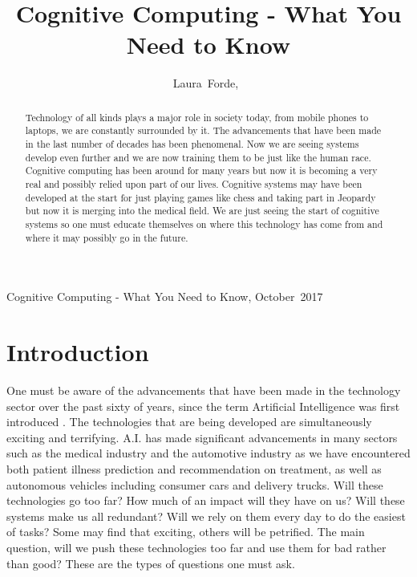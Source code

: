 \documentclass[journal]{IEEEtran}
\begin{document}
%
{Cognitive Computing - What You Need to Know, October~2017}

\title{Cognitive Computing - What You Need to Know}
\author{Laura~Forde,~%
}

\maketitle


\begin{abstract}
Technology of all kinds plays a major role in society today, from mobile phones to laptops, we are constantly surrounded by it. The advancements that have been made in the last number of decades has been phenomenal. Now we are seeing systems develop even further and we are now training them to be just like the human race. Cognitive computing has been around for many years but now it is becoming a very real and possibly relied upon part of our lives. Cognitive systems may have been developed at the start for just playing games like chess and taking part in Jeopardy but now it is merging into the medical field. We are just seeing the start of cognitive systems so one must educate themselves on where this technology has come from and where it may possibly go in the future.
\end{abstract}



\section{Introduction}
One must be aware of the advancements that have been made in the technology sector over the past sixty of years, since the term Artificial Intelligence was first introduced \cite{IBMResearch}. The technologies that are being developed are simultaneously exciting and terrifying. A.I. has made significant advancements in many sectors such as the medical industry\cite{WellPointIBM} and the automotive industry as we have encountered both patient illness prediction and recommendation on treatment, as well as autonomous vehicles including consumer cars and delivery trucks\cite{auto}. Will these technologies go too far? How much of an impact will they have on us? Will these systems make us all redundant? Will we rely on them every day to do the easiest of tasks? Some may find that exciting, others will be petrified. The main question, will we push these technologies too far and use them for bad rather than good? These are the types of questions one must ask.
\end{document}

